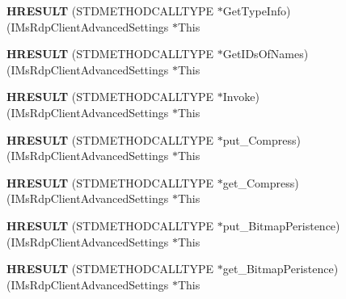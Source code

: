 \begin{DoxyCompactItemize}
{\bfseries H\+R\+E\+S\+U\+LT} (S\+T\+D\+M\+E\+T\+H\+O\+D\+C\+A\+L\+L\+T\+Y\+PE $\ast$Get\+Type\+Info)(I\+Ms\+Rdp\+Client\+Advanced\+Settings $\ast$This
\item 
\mbox{\label{struct_i_ms_rdp_client_advanced_settings_vtbl_ac2304694a944a0ff740bb19db15661b4}} 
{\bfseries H\+R\+E\+S\+U\+LT} (S\+T\+D\+M\+E\+T\+H\+O\+D\+C\+A\+L\+L\+T\+Y\+PE $\ast$Get\+I\+Ds\+Of\+Names)(I\+Ms\+Rdp\+Client\+Advanced\+Settings $\ast$This
\item 
\mbox{\label{struct_i_ms_rdp_client_advanced_settings_vtbl_a9cd33542febcc8c2e982b1a45361481e}} 
{\bfseries H\+R\+E\+S\+U\+LT} (S\+T\+D\+M\+E\+T\+H\+O\+D\+C\+A\+L\+L\+T\+Y\+PE $\ast$Invoke)(I\+Ms\+Rdp\+Client\+Advanced\+Settings $\ast$This
\item 
\mbox{\label{struct_i_ms_rdp_client_advanced_settings_vtbl_ad49684c35c2a70def851f9214a58a5de}} 
{\bfseries H\+R\+E\+S\+U\+LT} (S\+T\+D\+M\+E\+T\+H\+O\+D\+C\+A\+L\+L\+T\+Y\+PE $\ast$put\+\_\+\+Compress)(I\+Ms\+Rdp\+Client\+Advanced\+Settings $\ast$This
\item 
\mbox{\label{struct_i_ms_rdp_client_advanced_settings_vtbl_aea831fa0712b3d20cf8ab041144fcdec}} 
{\bfseries H\+R\+E\+S\+U\+LT} (S\+T\+D\+M\+E\+T\+H\+O\+D\+C\+A\+L\+L\+T\+Y\+PE $\ast$get\+\_\+\+Compress)(I\+Ms\+Rdp\+Client\+Advanced\+Settings $\ast$This
\item 
\mbox{\label{struct_i_ms_rdp_client_advanced_settings_vtbl_ae11f24d628bda489f69366c6aef94b8c}} 
{\bfseries H\+R\+E\+S\+U\+LT} (S\+T\+D\+M\+E\+T\+H\+O\+D\+C\+A\+L\+L\+T\+Y\+PE $\ast$put\+\_\+\+Bitmap\+Peristence)(I\+Ms\+Rdp\+Client\+Advanced\+Settings $\ast$This
\item 
\mbox{\label{struct_i_ms_rdp_client_advanced_settings_vtbl_ad00fda58249639cc7ab4d0e8d2b7cabb}} 
{\bfseries H\+R\+E\+S\+U\+LT} (S\+T\+D\+M\+E\+T\+H\+O\+D\+C\+A\+L\+L\+T\+Y\+PE $\ast$get\+\_\+\+Bitmap\+Peristence)(I\+Ms\+Rdp\+Client\+Advanced\+Settings $\ast$This
\item 
\mbox{\label{struct_i_ms_rdp_client_advanced_settings_vtbl_a3127308c56f34f2cbcd1031af30fbc50}} 

\end{DoxyCompactItemize}
